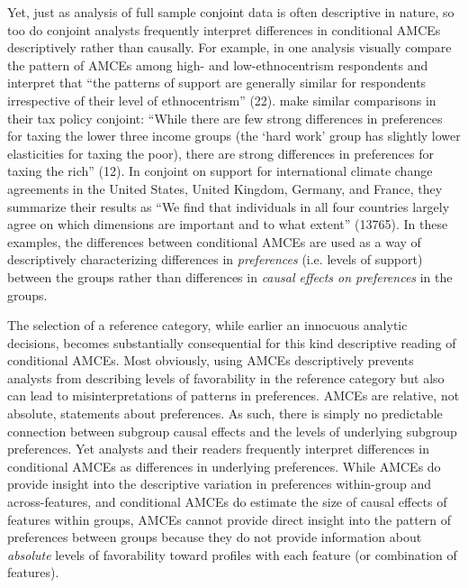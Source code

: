 \documentclass[a4paper,12pt]{article}\usepackage[]{graphicx}\usepackage[]{color}
\begin{document}
Yet, just as analysis of full sample conjoint data is often descriptive in nature, so too do conjoint analysts frequently interpret differences in conditional AMCEs descriptively rather than causally. For example, in one analysis \citet{HainmuellerHopkinsYamamoto2014} visually compare the pattern of AMCEs among high- and low-ethnocentrism respondents and interpret that ``the patterns of support are generally similar for respondents irrespective of their level of ethnocentrism'' (22). \citet{BallardRosaMartinScheve2016} make similar comparisons in their tax policy conjoint: ``While there are few strong differences in preferences for taxing the lower three income groups (the `hard work' group has slightly lower elasticities for taxing the poor), there are strong differences in preferences for taxing the rich'' (12). In \citet{BechtelScheve2013} conjoint on support for international climate change agreements in the United States, United Kingdom, Germany, and France, they summarize their results as ``We find that individuals in all four countries largely agree on which dimensions are important and to what extent'' (13765). In these examples, the differences between conditional AMCEs are used as a way of descriptively characterizing differences in \textit{preferences} (i.e. levels of support) between the groups rather than differences in \textit{causal effects on preferences} in the groups.

The selection of a reference category, while earlier an innocuous analytic decisions, becomes substantially consequential for this kind descriptive reading of conditional AMCEs. Most obviously, using AMCEs descriptively prevents analysts from describing levels of favorability in the reference category but also can lead to misinterpretations of patterns in preferences. AMCEs are relative, not absolute, statements about preferences. As such, there is simply no predictable connection between subgroup causal effects and the levels of underlying subgroup preferences. Yet analysts and their readers frequently interpret differences in conditional AMCEs as differences in underlying preferences. While AMCEs do provide insight into the descriptive variation in preferences within-group and across-features, and conditional AMCEs do estimate the size of causal effects of features within groups, AMCEs cannot provide direct insight into the pattern of preferences between groups because they do not provide information about \textit{absolute} levels of favorability toward profiles with each feature (or combination of features).
\end{document}
